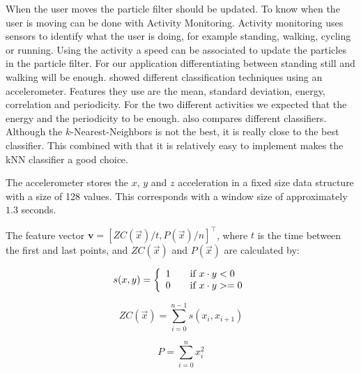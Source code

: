 \documentclass[journal]{IEEEtran}
\begin{document}
When the user moves the particle filter should be updated. To know when the
user is moving can be done with Activity Monitoring. Activity monitoring uses
sensors to identify what the user is doing, for example standing, walking,
cycling or running. Using the activity a speed can be associated to update the
particles in the particle filter. For our application differentiating between
standing still and walking will be enough. \cite{ravi2005activity} showed
different classification techniques using an accelerometer. Features they use
are the mean, standard deviation, energy, correlation and periodicity.  For the
two different activities we expected that the energy and the periodicity to
be enough. \cite{ravi2005activity} also compares different classifiers.
Although the $k$-Nearest-Neighbors is not the best, it is really close to the
best classifier. This combined with that it is relatively easy to implement
makes the kNN classifier a good choice.

The accelerometer stores the $x$, $y$ and $z$ acceleration in a fixed size
data structure with a size of 128 values. This corresponds with a window size
of approximately $1.3$ seconds.

The feature vector $\mathbf{v} = [ZC(\vec x) / t, P(\vec x)/ n]^\intercal$,
where $t$ is the time between the first and last points, and $ZC(\vec x)$ and
$P(\vec x)$ are calculated by:

\begin{equation}
  s(x,y) = \left\{
    \begin{array}{l l}
      1 & \quad \text{if~} x \cdot y < 0 \\
      0 & \quad \text{if~} x \cdot y >= 0
  \end{array} \right.
\end{equation}

\begin{equation}
  ZC(\vec x) = \sum^{n-1}_{i=0} s(x_i, x_{i+1})
\end{equation}

\begin{equation}
  P = \sum^{n}_{i=0} x_i^2
\end{equation}
\end{document}
